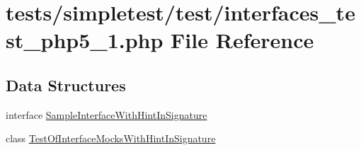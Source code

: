 \hypertarget{interfaces__test__php5__1_8php}{\section{tests/simpletest/test/interfaces\-\_\-test\-\_\-php5\-\_\-1.php File Reference}
\label{interfaces__test__php5__1_8php}
}
\subsection*{Data Structures}
\begin{DoxyCompactItemize}
\item 
interface \hyperlink{interface_sample_interface_with_hint_in_signature}{Sample\-Interface\-With\-Hint\-In\-Signature}
\item 
class \hyperlink{class_test_of_interface_mocks_with_hint_in_signature}{Test\-Of\-Interface\-Mocks\-With\-Hint\-In\-Signature}
\end{DoxyCompactItemize}
